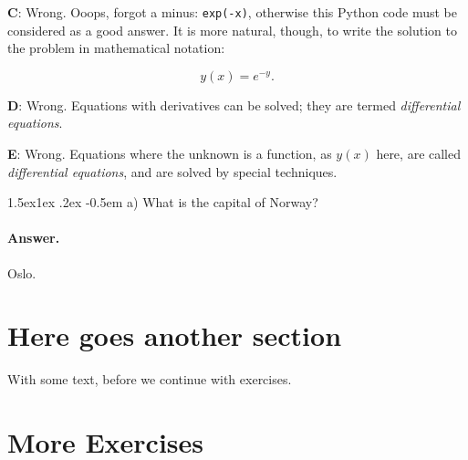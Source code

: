 \n\documentclass[%
oneside,                 %
final,                   %
10pt]{article}
\makeatletter
\newenvironment{doconcequiz}{}{}
\newenvironment{doconceexercise}{}{}
\newcounter{doconceexercisecounter}
\newcommand\subex{\@startsection{paragraph}{4}{\z@}%
                  {1.5ex\@plus1ex \@minus.2ex}%
                  {-0.5em}%
                  {\normalfont\normalsize\bfseries}}
\theoremstyle{definition}
\makeatother
\begin{document}
\begin{enumerate}
\begin{doconceexercise}
\begin{doconcequiz}
\textbf{C}: Wrong. Ooops, forgot a minus: \texttt{exp(-x)}, otherwise this Python code
must be considered as a good answer. It is more natural,
though, to write the solution to the problem
in mathematical notation:

\[ y(x) = e^{-y}.\]

\textbf{D}: Wrong. Equations with derivatives can be solved;
they are termed \emph{differential
equations}.

\textbf{E}: Wrong. Equations where the unknown is a function, as $y(x)$
here, are called \emph{differential equations}, and are solved by
special techniques.




\vspace{3mm}

\end{doconcequiz}



\end{doconceexercise}

\begin{doconceexercise}

                             


\subex{a)}
What is the capital of Norway?

\paragraph{Answer.}
Oslo.


\end{doconceexercise}

\section{Here goes another section}

With some text, before we continue with exercises.

\section{More Exercises}


\end{enumerate}
\end{document}
